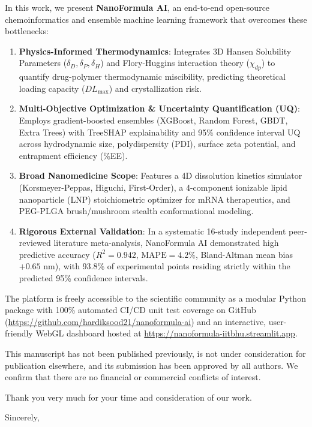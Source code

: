 \documentclass[11pt]{article}
\begin{document}
In this work, we present \textbf{NanoFormula AI}, an end-to-end open-source chemoinformatics and ensemble machine learning framework that overcomes these bottlenecks:
\begin{enumerate}
    \item \textbf{Physics-Informed Thermodynamics}: Integrates 3D Hansen Solubility Parameters ($\delta_D, \delta_P, \delta_H$) and Flory-Huggins interaction theory ($\chi_{dp}$) to quantify drug-polymer thermodynamic miscibility, predicting theoretical loading capacity ($DL_{\max}$) and crystallization risk.
    \item \textbf{Multi-Objective Optimization \& Uncertainty Quantification (UQ)}: Employs gradient-boosted ensembles (XGBoost, Random Forest, GBDT, Extra Trees) with TreeSHAP explainability and 95\% confidence interval UQ across hydrodynamic size, polydispersity (PDI), surface zeta potential, and entrapment efficiency (\%EE).
    \item \textbf{Broad Nanomedicine Scope}: Features a 4D dissolution kinetics simulator (Korsmeyer-Peppas, Higuchi, First-Order), a 4-component ionizable lipid nanoparticle (LNP) stoichiometric optimizer for mRNA therapeutics, and PEG-PLGA brush/mushroom stealth conformational modeling.
    \item \textbf{Rigorous External Validation}: In a systematic 16-study independent peer-reviewed literature meta-analysis, NanoFormula AI demonstrated high predictive accuracy ($R^2 = 0.942$, $\text{MAPE} = 4.2\%$, Bland-Altman mean bias $+0.65\text{ nm}$), with 93.8\% of experimental points residing strictly within the predicted 95\% confidence intervals.
\end{enumerate}

The platform is freely accessible to the scientific community as a modular Python package with 100\% automated CI/CD unit test coverage on GitHub (\url{https://github.com/hardiksood21/nanoformula-ai}) and an interactive, user-friendly WebGL dashboard hosted at \url{https://nanoformula-iitbhu.streamlit.app}.

This manuscript has not been published previously, is not under consideration for publication elsewhere, and its submission has been approved by all authors. We confirm that there are no financial or commercial conflicts of interest.

Thank you very much for your time and consideration of our work.

\vspace{1.5em}
\noindent
Sincerely,
\end{document}
